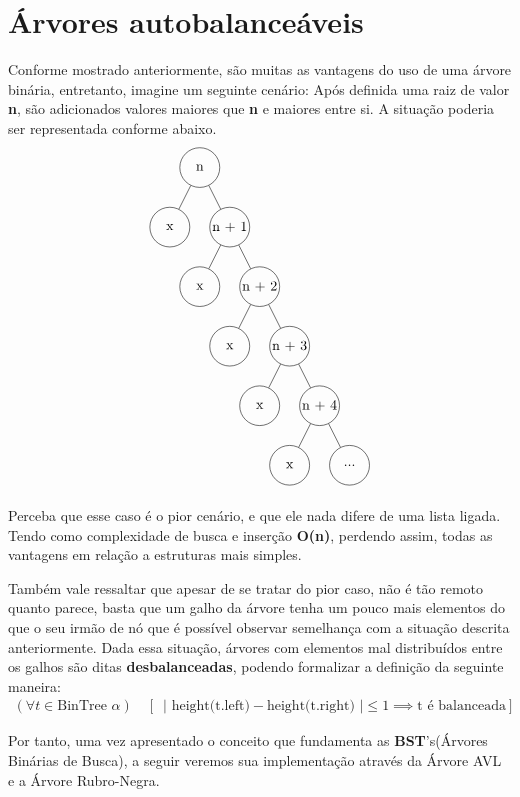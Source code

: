 \chapter{Árvores autobalanceáveis}
\label{ch:auto_bal} %

%
Conforme mostrado anteriormente, são muitas as vantagens do uso de uma árvore binária, entretanto, imagine um seguinte cenário: Após definida uma raiz de valor \textbf{n}, são adicionados valores maiores que \textbf{n} e maiores entre si. A situação poderia ser representada conforme abaixo.
\begin{align*}
		\begin{tikzpicture}[
			every node/.style={circle, draw, minimum size=1.0cm, inner sep=0},
		]
               \node {n}
                       child {node {x}}
                       child {node {n + 1}
                               child {node {x}}
                               child {node {n + 2}
                                       child {node {x}}
                                       child {node {n + 3}
                                               child {node {x}}
                                               child {node {n + 4}
                                                       child {node {x}}
                                                       child {node {...}}}}}};
       \end{tikzpicture}
\end{align*}
 
Perceba que esse caso é o pior cenário, e que ele nada difere de uma lista ligada. Tendo como complexidade de busca e inserção \textbf{O(n)}, perdendo assim, todas as vantagens em relação a estruturas mais simples.
 
 Também vale ressaltar que apesar de se tratar do pior caso, não é tão remoto quanto parece, basta que um galho da árvore tenha um pouco mais elementos do que o seu irmão de nó que é possível observar semelhança com a situação descrita anteriormente. Dada essa situação, árvores com elementos mal distribuídos entre os galhos são ditas \textbf{desbalanceadas}, podendo formalizar a definição da seguinte maneira:
\begin{align*}
       (\forall t \in \text{BinTree } \alpha) \quad 
       \left[ \, \text{ | height(t.left)} - \text{height(t.right) |} \leq 1 \implies \text{t é balanceada} \right]
\end{align*}

Por tanto, uma vez apresentado o conceito que fundamenta as \textbf{BST}'s(Árvores Binárias de Busca), a seguir veremos sua implementação através da Árvore AVL e a Árvore Rubro-Negra.


\newpage


\newpage
